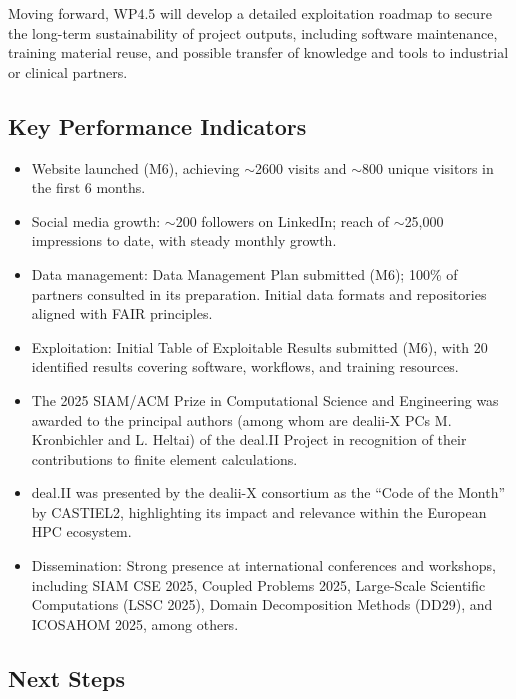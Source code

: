 \documentclass[a4paper,12pt, numbers]{article}
\begin{document}
Moving forward, WP4.5 will develop a detailed exploitation roadmap to secure the long-term sustainability of project outputs, including software maintenance, training material reuse, and possible transfer of knowledge and tools to industrial or clinical partners.



\subsection{Key Performance Indicators} %
\begin{itemize}[left=1em, itemsep=0pt, topsep=0pt]
\item Website launched (M6), achieving $\sim$2600 visits and $\sim$800 unique visitors in the first 6 months.
\item Social media growth: $\sim$200 followers on LinkedIn; reach of $\sim$25,000 impressions to date, with steady monthly growth.
\item Data management: Data Management Plan submitted (M6); 100\% of partners consulted in its preparation. Initial data formats and repositories aligned with FAIR principles.
\item Exploitation: Initial Table of Exploitable Results submitted (M6), with 20 identified results covering software, workflows, and training resources.
\item The 2025 SIAM/ACM Prize in Computational Science and Engineering was awarded to the principal authors (among whom are dealii-X PCs M. Kronbichler and L. Heltai) of the deal.II Project in recognition of their contributions to finite element calculations.
\item deal.II was presented by the dealii-X consortium as the “Code of the Month” by CASTIEL2, highlighting its impact and relevance within the European HPC ecosystem. 
\item Dissemination: Strong presence at international conferences and workshops, including SIAM CSE 2025, Coupled Problems 2025, Large-Scale Scientific Computations (LSSC 2025), Domain Decomposition Methods (DD29), and ICOSAHOM 2025, among others.
\end{itemize}


\subsection{Next Steps} %
\end{document}
